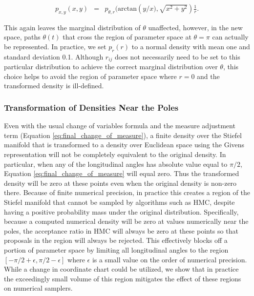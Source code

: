 \documentclass[ba]{imsart}
\numberwithin{equation}{section}
\theoremstyle{plain}
\begin{document}
\begin{eqnarray}
p_{x, y}(x,y) &=& p_{\theta, r}(\mathrm{arctan} \left(y/x), \sqrt{x^2 + y^2} \right) \frac{1}{r}.
\end{eqnarray}

\noindent This again leaves the marginal distribution of $\theta$ unaffected, however, in the new space, paths $\theta(t)$ that cross the region of parameter space at $\theta = \pi$ can actually be represented. In practice, we set  $p_r(r)$ to a normal density with mean one and standard deviation 0.1. Although $r_{ij}$ does not necessarily need to be set to this particular distribution to achieve the correct marginal distribution over $\theta$, this choice helps to avoid the region of parameter space where $r = 0$ and the transformed density is ill-defined.

\subsubsection{Transformation of Densities Near the Poles}
\noindent  Even with the usual change of variables formula and the measure adjustment term (Equation \ref{eq:final_change_of_measure}), a finite density over the Stiefel manifold that is transformed to a density over Euclidean space using the Givens representation will not be completely equivalent to the original density. In particular, when any of the longitudinal angles has absolute value equal to $\pi/2$, Equation \ref{eq:final_change_of_measure} will equal zero. Thus the transformed density will be zero at these points even when the original density is non-zero there. Because of finite numerical precision, in practice this creates a region of the Stiefel manifold that cannot be sampled by algorithms such as HMC, despite having a positive probability mass under the original distribution. Specifically, because a computed numerical density will be zero at values numerically near the poles, the acceptance ratio in HMC will always be zero at these points so that proposals in the region will always be rejected. This effectively blocks off a portion of parameter space by limiting all longitudinal angles to the region $[-\pi/2 + \epsilon, \pi/2 - \epsilon]$ where $\epsilon$ is a small value on the order of numerical precision. While a change in coordinate chart could be utilized, we show that in practice the exceedingly small volume of this region mitigates the effect of these regions on numerical samplers.
\end{document}
